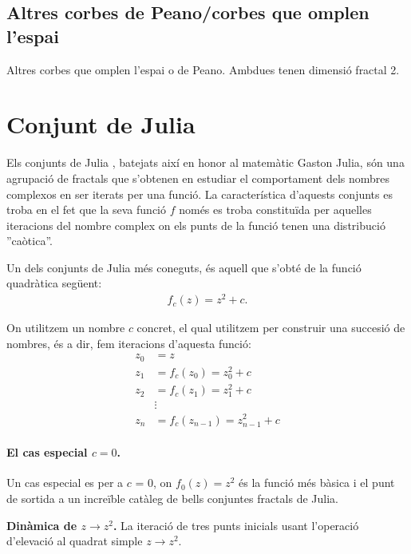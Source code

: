 \documentclass[12pt,a4paper]{report}
\begin{document}
\subsection{Altres corbes de Peano/corbes que omplen l'espai}
\begin{table}[!ht]
\centering
{}
\caption{Altres corbes que omplen l'espai o de Peano. Ambdues tenen dimensió fractal 2.}
\end{table}
\newpage
\section{Conjunt de Julia}
Els conjunts de Julia \cite{JuliaMandelbrot}, batejats així en honor al matemàtic Gaston Julia, són una agrupació de fractals que s'obtenen en estudiar el comportament dels nombres complexos en ser iterats per una funció. La característica d'aquests conjunts es troba en el fet que la seva funció $f$ només es troba constituïda per aquelles iteracions del nombre complex on els punts de la funció tenen una distribució ''caòtica''.

Un dels conjunts de Julia més coneguts, és aquell que s'obté de la funció quadràtica següent:
\begin{align}\label{eq02_julia}
f_{c}(z)=z^2 + c.
\end{align}

On utilitzem un nombre $c$ concret, el qual utilitzem per construir una succesió de nombres, és a dir, fem iteracions d'aquesta funció:
\begin{align*}
z_0 &= z \\
z_1 &= f_{c}(z_0)= z_{0}^2 + c \\
z_2 &= f_{c}(z_1) =z_{1}^2+c \\
& \vdots \\
z_n &= f_{c}(z_{n-1}) =z_{n-1}^2+c 
\end{align*}

\paragraph*{El cas especial $c=0$.} Un cas especial es per a $c$ = 0, on $f_{0}(z) = z^{2}$ és la funció més bàsica i el punt de sortida a un increïble catàleg de bells conjuntes fractals de Julia. 

\begin{table}[!ht]
\centering
{}
\caption{\textbf{Dinàmica de $z\rightarrow z^2$.} La iteració de tres punts inicials usant l'operació d'elevació al quadrat simple $z\rightarrow z^{2}$.}
\label{tab03_02_01}
\end{table}
\end{document}
